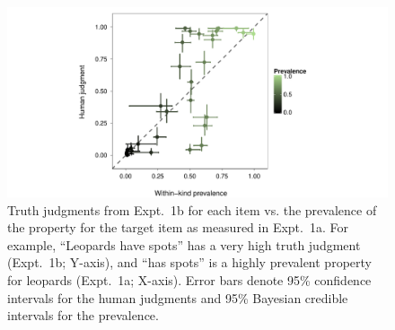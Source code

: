 \documentclass[10pt,letterpaper]{article}
\begin{document}
%


\begin{figure}
\centering
    \includegraphics[width=\columnwidth]{tj_n100_tjVsPrevalence_95hdi-colorPrev.pdf}
    \caption{Truth judgments from Expt.~1b for each item vs. the prevalence of the property for the target item as measured in Expt.~1a. For example, ``Leopards have spots'' has a very high truth judgment (Expt.~1b; Y-axis), and ``has spots'' is a highly prevalent property for leopards (Expt.~1a; X-axis). Error bars denote 95\% confidence intervals for the human judgments and 95\% Bayesian credible intervals for the prevalence.
    }
  \label{fig:scatterprev}
\end{figure}
\end{document}
